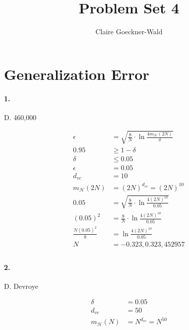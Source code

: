 \documentclass[10pt,letter]{article}
\begin{document}
\title{Problem Set 4}
\author{Claire Goeckner-Wald}
\maketitle 

\section*{Generalization Error}

\paragraph{1.} D. 460,000

	\begin{align*}
	\epsilon &= \sqrt{\frac{8}{N} \cdot \ln{\frac{4m_\mathcal{H}(2N)}{\delta}} } \\
	0.95 &\geq 1 - \delta \\
	\delta &\leq 0.05 \\
	\epsilon &= 0.05 \\
	d_{vc} &= 10 \\
	m_\mathcal{H}(2N) &= (2N)^{d_{vc}} = (2N)^{10} \\
	0.05 &= \sqrt{\frac{8}{N} \cdot \ln{\frac{4(2N)^{10}}{0.05}} } \\
	(0.05)^2 &= \frac{8}{N} \cdot \ln{\frac{4(2N)^{10}}{0.05}}  \\
	\frac{N(0.05)^2}{8} &= \ln{\frac{4(2N)^{10}}{0.05}}  \\
	N &= -0.323, 0.323, 452957 \\
	\end{align*}

\paragraph{2.} D. Devroye

	\begin{align*}
	\delta &= 0.05 \\
	d_{vc} &= 50 \\
	m_\mathcal{H}(N) &= N^{d_{vc}} = N^{50} \\
	\end{align*}
\end{document}
